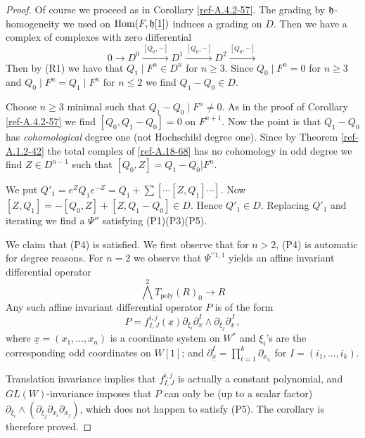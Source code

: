 \documentclass{amsart}
\numberwithin{equation}{section}
\theoremstyle{definition}
\theoremstyle{remark}
\begin{document}
\begin{proof} Of course we proceed as in Corollary \ref{ref-A.4.2-57}. 
The grading by $\frak{h}$-homogeneity we used on ${\operatorname {Hom}}(F,\frak{h}[1])$ induces
a grading on $D$. Then we have a complex of complexes with zero differential
\begin{equation}
\label{ref-A.18-68}
0\rightarrow D^0\xrightarrow{[Q_0,-]} D^1\xrightarrow{[Q_0,-]} D^2\xrightarrow{[Q_0,-]}
\end{equation}
Then by (R1) we have that $Q_1{\mid} F^{n}\in D^n$ for $n\ge 3$. Since
$Q_0{\mid} F^{n}=0$ for $n\ge 3$ and $Q_0{\mid} F^n=Q_1{\mid} F^n$ for
$n\le 2$ we find $Q_1-Q_0\in D$.

Choose $n\ge 3$ minimal such that $Q_1-Q_0{\mid} F^n\neq 0$.  As in
the proof of Corollary \ref{ref-A.4.2-57} we find $[Q_0,Q_1-Q_0]=0$
on $F^{n+1}$. Now the point is that $Q_1-Q_0$ has \emph{cohomological}
degree one (not Hochschild degree one). Since by Theorem
\ref{ref-A.1.2-42} the total complex of \eqref{ref-A.18-68} has no
cohomology in odd degree we find $Z\in D^{n-1}$ such that
$[Q_0,Z]=Q_1-Q_0|F^n$.

We put $Q'_1=
e^ZQ_1e^{-Z}=Q_1+\sum [\cdots [Z,Q_1]\cdots]$. Now $[Z,Q_1]=-[Q_0,Z]+[Z,Q_1-Q_0]\in D$. Hence $Q'_1\in D$. Replacing $Q'_1$ and iterating we find a $\Psi''$
satisfying (P1)(P3)(P5). 

We claim that (P4) is  satisfied. We first observe that
for $n>2$, (P4) is automatic for degree reasons. For $n=2$ we observe that
$\Psi^{\prime\prime 1,1}$ yields an affine invariant differential operator 
\begin{equation}
\label{ref-A.19-69}
\bigwedge^2 T_{\operatorname{poly}}(R)_0\rightarrow R
\end{equation}
Any such affine invariant differential operator $P$ is of the form 
$$
P=f^{i,j}_{I,J}(\underline{x})\partial_{\xi_i}\partial^I_{\underline{x}}\wedge\partial_{\xi_j}\partial^J_{\underline{x}}\,,
$$
where $\underline{x}=(x_1,\dots,x_n)$ is a coordinate system on $W^*$
and $\xi_i$'s are the corresponding odd coordinates on $W[1]$; and
$\partial^I_{\underline{x}}=\prod_{t=1}^k\partial_{x_{i_t}}$ for
$I=(i_1,\dots,i_k)$.

Translation invariance implies that $f^{i,j}_{I,J}$ is actually a constant polynomial, and $GL(W)$-invariance 
imposes that $P$ can only be (up to a scalar factor) $\partial_{\xi_i}\wedge(\partial_{\xi_j}\partial_{x_i}\partial_{x_j})$, which does not happen to satisfy (P5). 
The corollary is therefore proved.
\end{proof}
\end{document}
